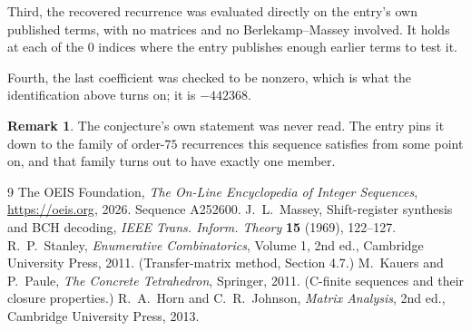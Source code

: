 \documentclass[11pt,a4paper]{article}
\theoremstyle{plain}
\theoremstyle{definition}
\newtheorem{remark}[theorem]{Remark}
\begin{document}
Third, the recovered recurrence was evaluated directly on the entry's own published terms, with
no matrices and no Berlekamp--Massey involved. It holds at each of the $0$ indices where
the entry publishes enough earlier terms to test it.

Fourth, the last coefficient was checked to be nonzero, which is what the identification above
turns on; it is $-442368$.

\begin{remark}
The conjecture's own statement was never read. The entry pins it down to the family of
order-$75$ recurrences this sequence satisfies from some point on, and that family turns
out to have exactly one member.
\end{remark}

\begin{thebibliography}{9}
 The OEIS Foundation, \emph{The On-Line Encyclopedia of Integer
Sequences}, \url{https://oeis.org}, 2026. Sequence A252600.
 J.~L.~Massey, Shift-register synthesis and BCH decoding, \emph{IEEE
Trans. Inform. Theory} \textbf{15} (1969), 122--127.
 R.~P.~Stanley, \emph{Enumerative Combinatorics}, Volume 1, 2nd ed.,
Cambridge University Press, 2011. (Transfer-matrix method, Section 4.7.)
 M.~Kauers and P.~Paule, \emph{The Concrete Tetrahedron}, Springer, 2011.
(C-finite sequences and their closure properties.)
 R.~A.~Horn and C.~R.~Johnson, \emph{Matrix Analysis}, 2nd ed., Cambridge
University Press, 2013.
\end{thebibliography}
\end{document}
